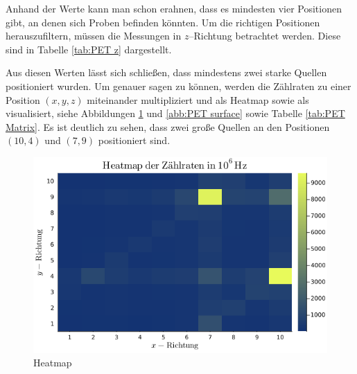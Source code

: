 \documentclass[12pt,a4paper]{scrartcl}
\numberwithin{equation}{section} %
\begin{document}
Anhand der Werte kann man schon erahnen, dass es mindesten vier Positionen gibt, an denen sich Proben befinden könnten. Um die richtigen Positionen herauszufiltern, müssen die Messungen in $z$--Richtung betrachtet werden. Diese sind in Tabelle \ref{tab:PET z} dargestellt.


Aus diesen Werten lässt sich schließen, dass mindestens zwei starke Quellen positioniert wurden. Um genauer sagen zu können, werden die Zählraten zu einer Position $(x,y,z)$ miteinander multipliziert und als Heatmap sowie als visualisiert, siehe Abbildungen \ref{abb:PET heatmap} und \ref{abb:PET surface} sowie Tabelle \ref{tab:PET Matrix}. Es ist deutlich zu sehen, dass zwei große Quellen an den Positionen $(10,4)$ und $(7,9)$ positioniert sind.

\begin{figure}[h!]
	\centering
	\begin{minipage}[t]{0.7\textwidth}
		\includegraphics[width=\textwidth]{../media/B3.4/heatmap.png}
		\caption{Heatmap}
		\label{abb:PET heatmap}
	\end{minipage}


\end{figure}
\end{document}
